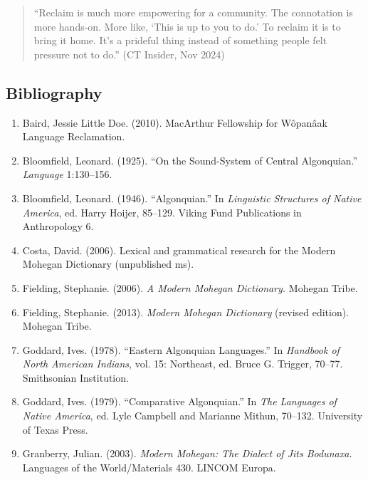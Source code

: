 \begin{quote}
``Reclaim is much more empowering for a community. The connotation is more
hands-on. More like, `This is up to you to do.' To reclaim it is to bring it
home. It's a prideful thing instead of something people felt pressure not to
do.'' (CT Insider, Nov 2024)
\end{quote}

\subsection{Bibliography}

\begin{enumerate}

\item Baird, Jessie Little Doe. (2010). MacArthur Fellowship for Wôpanâak
Language Reclamation.

\item Bloomfield, Leonard. (1925). ``On the Sound-System of Central
Algonquian.'' \emph{Language} 1:130--156.

\item Bloomfield, Leonard. (1946). ``Algonquian.'' In \emph{Linguistic
Structures of Native America}, ed. Harry Hoijer, 85--129. Viking Fund
Publications in Anthropology 6.

\item Costa, David. (2006). Lexical and grammatical research for the Modern
Mohegan Dictionary (unpublished ms).

\item Fielding, Stephanie. (2006). \emph{A Modern Mohegan Dictionary.}
Mohegan Tribe.

\item Fielding, Stephanie. (2013). \emph{Modern Mohegan Dictionary} (revised
edition). Mohegan Tribe.

\item Goddard, Ives. (1978). ``Eastern Algonquian Languages.'' In
\emph{Handbook of North American Indians}, vol. 15: Northeast, ed. Bruce G.
Trigger, 70--77. Smithsonian Institution.

\item Goddard, Ives. (1979). ``Comparative Algonquian.'' In \emph{The
Languages of Native America}, ed. Lyle Campbell and Marianne Mithun, 70--132.
University of Texas Press.

\item Granberry, Julian. (2003). \emph{Modern Mohegan: The Dialect of Jits
Bodunaxa.} Languages of the World/Materials 430. LINCOM Europa.


\end{enumerate}

